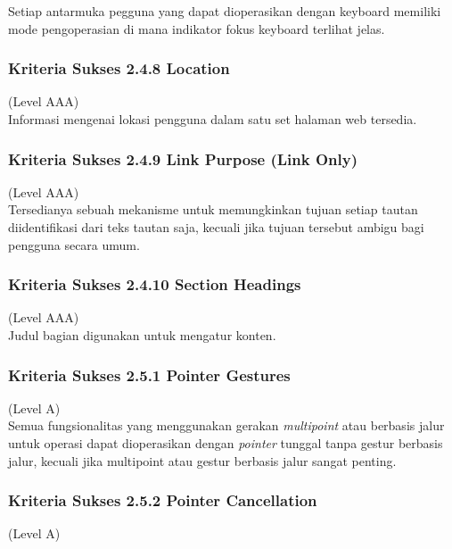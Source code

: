 \documentclass[a4paper,twoside]{article}
\begin{document}
\begin{enumerate}
		Setiap antarmuka pegguna yang dapat dioperasikan dengan keyboard memiliki mode pengoperasian di mana indikator fokus keyboard terlihat jelas.
		
		\subsubsection*{Kriteria Sukses 2.4.8 Location}
		\label{subsubsec:kriteria_2.4.8}
		(Level AAA) \\
		
		Informasi mengenai lokasi pengguna dalam satu set halaman web tersedia.
		
		\subsubsection*{Kriteria Sukses 2.4.9 Link Purpose (Link Only)}
		\label{subsubsec:kriteria_2.4.9}
		(Level AAA) \\
		
		Tersedianya sebuah mekanisme untuk memungkinkan tujuan setiap tautan diidentifikasi dari teks tautan saja, kecuali jika tujuan tersebut ambigu bagi pengguna secara umum.
		
		\subsubsection*{Kriteria Sukses 2.4.10 Section Headings}
		\label{subsubsec:kriteria_2.4.10}
		(Level AAA) \\
		
		Judul bagian digunakan untuk mengatur konten.
		
		\subsubsection*{Kriteria Sukses 2.5.1 Pointer Gestures}
		\label{subsubsec:kriteria_2.5.1}
		(Level A) \\
		
		Semua fungsionalitas yang menggunakan gerakan \textit{multipoint} atau berbasis jalur untuk operasi dapat dioperasikan dengan \textit{pointer} tunggal tanpa gestur berbasis jalur, kecuali jika multipoint atau gestur berbasis jalur sangat penting.
		
		\subsubsection*{Kriteria Sukses 2.5.2 Pointer Cancellation}
		\label{subsubsec:kriteria_2.5.2}
		(Level A) \\
		

\end{enumerate}
\end{document}
